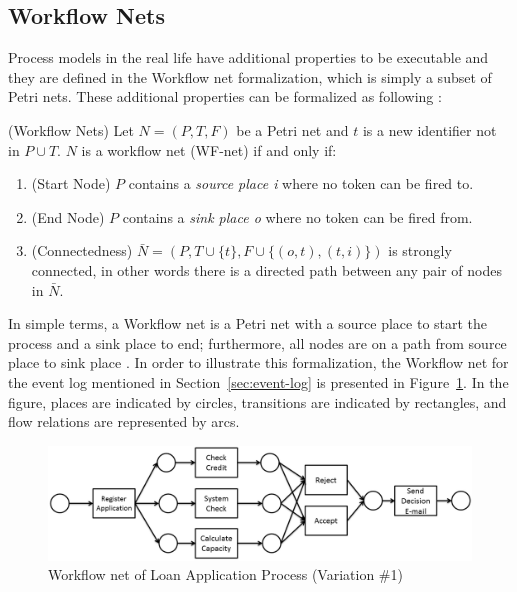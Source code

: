 \subsection{Workflow Nets}
\label{sec:workflow-nets}
Process models in the real life have additional properties to be executable and they are defined in the Workflow net formalization, which is simply a subset of Petri nets. These additional properties can be formalized as following \cite{van2013discovering}:
\theoremstyle{definition}
\begin{definition}{}
(Workflow Nets) Let $N = (P, T, F)$ be a Petri net and $t$ is a new identifier not in $P \cup T$. $N$ is a workflow net (WF-net) if and only if:
\begin{enumerate}
  \item (Start Node) $P$ contains a \textit{source place i} where no token can be fired to.
  \item (End Node) $P$ contains a \textit{sink place o} where no token can be fired from.
  \item (Connectedness) $\bar{N} = (P, T \cup \{t\}, F \cup \{(o,t),(t, i)\})$ is strongly connected, in other words there is a directed path between any pair of nodes in $\bar{N}$.
\end{enumerate}
\end{definition}

In simple terms, a Workflow net is a Petri net with a source place to start the process and a sink place to end; furthermore, all nodes are on a path from source place to sink place \cite{van1998application}.  In order to illustrate this formalization, the Workflow net for the event log mentioned in Section~\ref{sec:event-log} is presented in Figure~\ref{fig:loan-petri-net}. In the figure, places are indicated by circles, transitions are indicated by rectangles, and flow relations are represented by arcs. 
\begin{figure}
  \centering
  \includegraphics[width=\textwidth]{3_background/loan-petri-net}
  \caption{Workflow net of Loan Application Process (Variation \#1)}
  \label{fig:loan-petri-net}
\end{figure}

